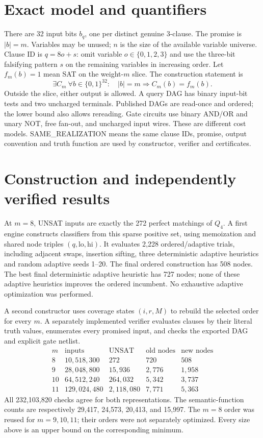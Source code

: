 \documentclass[11pt]{article}
\begin{document}
\section*{Exact model and quantifiers}
There are 32 input bits $b_q$, one per distinct genuine 3-clause. The promise is
$|b|=m$. Variables may be unused; $n$ is the size of the available variable universe.
Clause ID is $q=8o+s$: omit variable $o\in\{0,1,2,3\}$ and use the three-bit
falsifying pattern $s$ on the remaining variables in increasing order.
Let $f_m(b)=1$ mean SAT on the weight-$m$ slice. The construction statement is
\[
\exists C_m\ \forall b\in\{0,1\}^{32}:
\quad |b|=m\Longrightarrow C_m(b)=f_m(b).
\]
Outside the slice, either output is allowed. A query DAG has binary input-bit
tests and two uncharged terminals. Published DAGs are read-once and ordered;
the lower bound also allows rereading. Gate circuits use binary AND/OR and unary
NOT, free fan-out, and uncharged input wires. These are different cost models.
SAME\_REALIZATION means the same clause IDs, promise, output convention and truth
function are used by constructor, verifier and certificates.

\section*{Construction and independently verified results}
At $m=8$, UNSAT inputs are exactly the 272 perfect matchings of $Q_4$.
A first engine constructs classifiers from this sparse positive set, using
memoization and shared node triples $(q,\mathrm{lo},\mathrm{hi})$.
It evaluates 2,228 ordered/adaptive trials, including adjacent swaps, insertion
sifting, three deterministic adaptive heuristics and random adaptive seeds 1--20.
The final ordered construction has 508 nodes. The best final deterministic
adaptive heuristic has 727 nodes; none of these adaptive heuristics improves
the ordered incumbent. No exhaustive adaptive optimization was performed.

A second constructor uses coverage states $(i,r,M)$ to rebuild the selected
order for every $m$. A separately implemented verifier evaluates clauses by
their literal truth values, enumerates every promised input, and checks the
exported DAG and explicit gate netlist.
\[
\begin{array}{c|r|r|r|r}
m&\text{inputs}&\text{UNSAT}&\text{old nodes}&\text{new nodes}\\\hline
8&10{,}518{,}300&272&720&508\\
9&28{,}048{,}800&15{,}936&2{,}776&1{,}958\\
10&64{,}512{,}240&264{,}032&5{,}342&3{,}737\\
11&129{,}024{,}480&2{,}118{,}080&7{,}771&5{,}363
\end{array}
\]
All 232,103,820 checks agree for both representations. The semantic-function
counts are respectively 29,417, 24,573, 20,413, and 15,997.
The $m=8$ order was reused for $m=9,10,11$; their orders were not separately
optimized. Every size above is an upper bound on the corresponding minimum.
\end{document}

